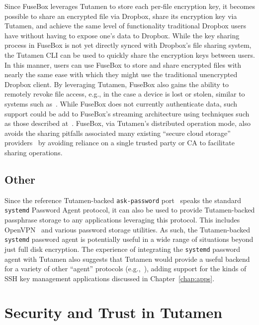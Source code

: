 Since FuseBox leverages Tutamen to store each per-file encryption key,
it becomes possible to share an encrypted file via Dropbox, share its
encryption key via Tutamen, and achieve the same level of
functionality traditional Dropbox users have without having to expose
one's data to Dropbox. While the key sharing process in FuseBox is not
yet directly synced with Dropbox's file sharing system, the Tutamen
CLI can be used to quickly share the encryption keys between users. In
this manner, users can use FuseBox to store and share encrypted files
with nearly the same ease with which they might use the traditional
unencrypted Dropbox client. By leveraging Tutamen, FuseBox also gains
the ability to remotely revoke file access, e.g., in the case a device
is lost or stolen, similar to systems such
as~\cite{geambasu2011}. While FuseBox does not currently authenticate
data, such support could be add to FuseBox's streaming architecture
using techniques such as those described
at~\cite{McGrew2005}. FuseBox, via Tutamen's distributed operation
mode, also avoids the sharing pitfalls associated many existing
``secure cloud storage'' providers~\cite{wilson2014} by avoiding
reliance on a single trusted party or CA to facilitate sharing
operations.

\subsection{Other}

Since the reference Tutamen-backed \texttt{ask-password}
port~\cite{src-tutamen-askpassword} speaks the standard
\texttt{systemd} Password Agent protocol, it can also be used to
provide Tutamen-backed passphrase storage to any applications
leveraging this protocol. This includes OpenVPN~\cite{openvpn} and
various password storage utilities. As such, the Tutamen-backed
\texttt{systemd} password agent is potentially useful in a wide range
of situations beyond just full disk encryption. The experience of
integrating the \texttt{systemd} password agent with Tutamen also
suggests that Tutamen would provide a useful backend for a variety of
other ``agent'' protocols (e.g.,~\cite{cox2002, ylonen1996}), adding
support for the kinds of SSH key management applications discussed in
Chapter~\ref{chap:apps}.

\section{Security and Trust in Tutamen}
\label{chap:tutamen:trust}

